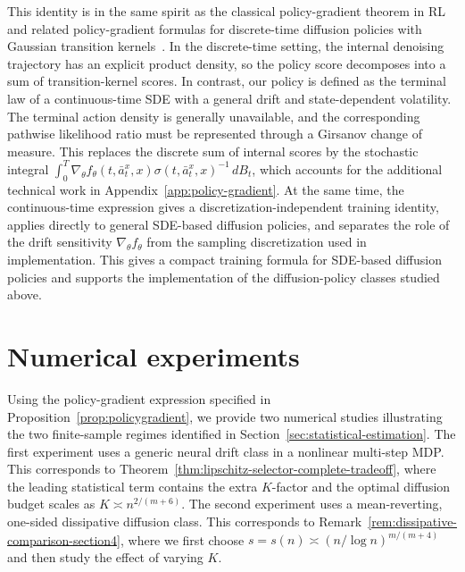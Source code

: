\documentclass{article}
\newcommand{\1}{\mathbbm{1}}
\numberwithin{equation}{section}
\begin{document}
This identity is in the same spirit as the classical policy-gradient theorem in
RL~\cite{sutton1999policy} and related policy-gradient formulas for discrete-time
diffusion policies with Gaussian transition kernels~\cite{psenka2024learning}.
In the discrete-time setting, the internal denoising trajectory has an explicit
product density, so the policy score decomposes into a sum of transition-kernel
scores. In contrast, our policy is defined as the terminal law of a
continuous-time SDE with a general drift and state-dependent volatility. The
terminal action density is generally unavailable, and the corresponding pathwise
likelihood ratio must be represented through a Girsanov change of measure. This
replaces the discrete sum of internal scores by the stochastic integral $\int_0^T
    \nabla_\theta f_\theta(t,\bar a^x_t,x)
    \sigma(t,\bar a_t^x,x)^{-1}\,dB_t$,
which accounts for the additional technical work in
Appendix~\ref{app:policy-gradient}. At the same time, the continuous-time
expression gives a discretization-independent training identity, applies
directly to general SDE-based diffusion policies, and separates the role of the
drift sensitivity \(\nabla_\theta f_\theta\) from the sampling discretization
used in implementation. This gives a compact training formula for SDE-based
diffusion policies and supports the implementation of the diffusion-policy
classes studied above.




\section{Numerical experiments}\label{sec:experiments}
Using the policy-gradient expression specified in Proposition~\ref{prop:policygradient}, we provide two numerical studies illustrating the two finite-sample regimes identified in Section~\ref{sec:statistical-estimation}. The first experiment uses a generic neural drift class in a nonlinear multi-step MDP. This corresponds to Theorem~\ref{thm:lipschitz-selector-complete-tradeoff}, where the leading statistical term contains the extra \(K\)-factor and the optimal diffusion budget scales as \(K\asymp n^{2/(m+6)}\). The second experiment uses a mean-reverting, one-sided dissipative diffusion
class. This corresponds to
Remark~\ref{rem:dissipative-comparison-section4}, where we first choose
\(s=s(n)\asymp(n/\log n)^{m/(m+4)}\) and then study the effect of varying \(K\).
\end{document}
